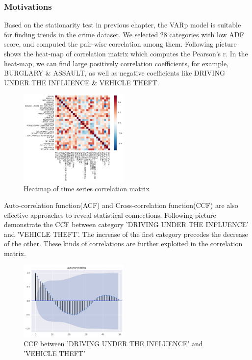 \documentclass[11pt,conference]{IEEEtran}
\begin{document}
\subsubsection{Motivations}
Based on the stationarity test in previous chapter, the VAR{p} model is suitable for finding trends in the crime dataset. We selected 28 categories with low ADF score, and computed the pair-wise correlation among them. Following picture shows the heat-map of correlation matrix which computes the Pearson's r. In the heat-map, we can find large positively correlation coefficients, for example, BURGLARY \& ASSAULT, as well as negative coefficients like DRIVING UNDER THE INFLUENCE \& VEHICLE THEFT.
\begin{figure}[H]
\begin{center}
\includegraphics [width=0.48\textwidth]{pics/heat_map_time_series.png}
\caption{Heatmap of time series correlation matrix }
\end{center}
\end{figure}
Auto-correlation function(ACF) and Cross-correlation function(CCF) are also effective approaches to reveal statistical connections. Following picture demonstrate the CCF between category 'DRIVING UNDER THE INFLUENCE' and 'VEHICLE THEFT'. The increase of the first category precedes the decrease of the other. These kinds of correlations are further exploited in the correlation matrix.
\begin{figure}[H]
\begin{center}
\includegraphics [width=0.48\textwidth]{pics/ccf_DRIVING_UNDER_THE_INFLUENCE_VEHICLE_THEFT.png}
\caption{CCF between 'DRIVING UNDER THE INFLUENCE' and 'VEHICLE THEFT'}
\end{center}
\end{figure}
\end{document}
